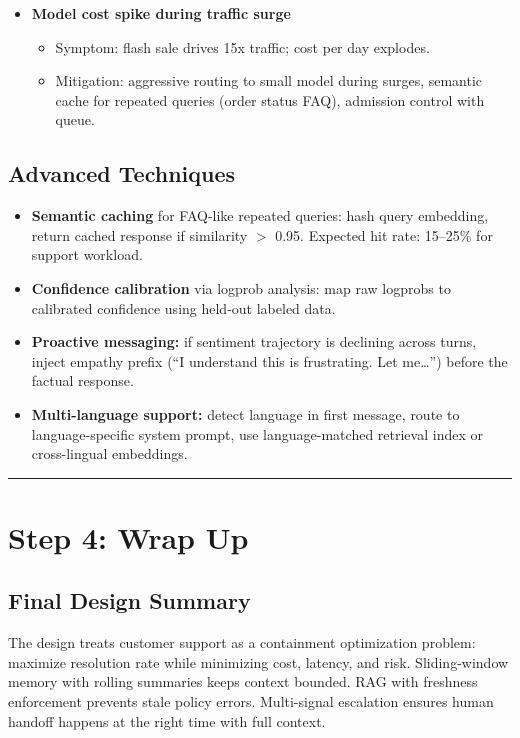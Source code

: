 \begin{itemize}
  \item \textbf{Model cost spike during traffic surge}
  \begin{itemize}
    \item Symptom: flash sale drives 15x traffic; cost per day explodes.
    \item Mitigation: aggressive routing to small model during surges, semantic cache for repeated queries (order status FAQ), admission control with queue.
  \end{itemize}
\end{itemize}

\subsection*{Advanced Techniques}

\begin{itemize}
  \item \textbf{Semantic caching} for FAQ-like repeated queries: hash query embedding, return cached response if similarity $>$ 0.95. Expected hit rate: 15--25\% for support workload.
  \item \textbf{Confidence calibration} via logprob analysis: map raw logprobs to calibrated confidence using held-out labeled data.
  \item \textbf{Proactive messaging:} if sentiment trajectory is declining across turns, inject empathy prefix (``I understand this is frustrating. Let me\ldots'') before the factual response.
  \item \textbf{Multi-language support:} detect language in first message, route to language-specific system prompt, use language-matched retrieval index or cross-lingual embeddings.
\end{itemize}

\bigskip\hrule\bigskip

\section*{Step 4: Wrap Up}

\subsection*{Final Design Summary}

The design treats customer support as a containment optimization problem: maximize resolution rate while minimizing cost, latency, and risk. Sliding-window memory with rolling summaries keeps context bounded. RAG with freshness enforcement prevents stale policy errors. Multi-signal escalation ensures human handoff happens at the right time with full context.

